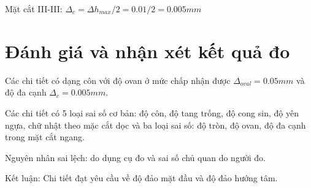 Mặt cắt III-III: $ \Delta_c = \Delta h_{max}/2 = 0.01/2 = 0.005 \unit{mm} $

\section{Đánh giá và nhận xét kết quả đo}
Các chi tiết có dạng côn với độ ovan ở mức chấp nhận được $ \Delta_{oval} = 0.05 \unit{mm} $ và độ đa cạnh $ \Delta_c =  0.005 \unit{mm} $.

Các chi tiết có 5 loại sai số cơ bản: độ côn, độ tang trống, độ cong sin, độ yên ngựa, chữ nhật theo mặc cắt dọc và ba loại sai số: độ tròn, độ ovan, độ đa cạnh trong mặt cắt ngang.

Nguyên nhân sai lệch: do dụng cụ đo và sai số chủ quan do người đo.

Kết luận: Chi tiết đạt yêu cầu về độ đảo mặt đầu và độ đảo hướng tâm.